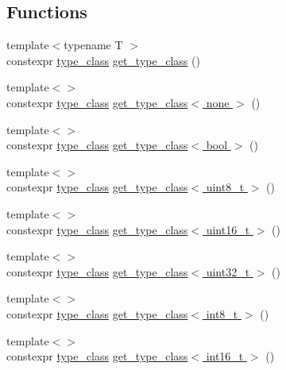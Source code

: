 \subsection*{Functions}
\begin{DoxyCompactItemize}
\item 
{\footnotesize template$<$typename T $>$ }\\constexpr \hyperlink{namespacetelegen_a72d4e69f0be1731e1a851a96dec858d8}{type\+\_\+class} \hyperlink{namespacetelegen_a6ea75c665a463a240f4a40419a810da3}{get\+\_\+type\+\_\+class} ()
\item 
{\footnotesize template$<$$>$ }\\constexpr \hyperlink{namespacetelegen_a72d4e69f0be1731e1a851a96dec858d8}{type\+\_\+class} \hyperlink{namespacetelegen_a19a101eacce3582135d74ce02117b4d6}{get\+\_\+type\+\_\+class$<$ none $>$} ()
\item 
{\footnotesize template$<$$>$ }\\constexpr \hyperlink{namespacetelegen_a72d4e69f0be1731e1a851a96dec858d8}{type\+\_\+class} \hyperlink{namespacetelegen_a63a694a138c7ec92f0d7ee249ba207cd}{get\+\_\+type\+\_\+class$<$ bool $>$} ()
\item 
{\footnotesize template$<$$>$ }\\constexpr \hyperlink{namespacetelegen_a72d4e69f0be1731e1a851a96dec858d8}{type\+\_\+class} \hyperlink{namespacetelegen_a393b0985d3f7fbe2c0d0a2ab5ce8cb4b}{get\+\_\+type\+\_\+class$<$ uint8\+\_\+t $>$} ()
\item 
{\footnotesize template$<$$>$ }\\constexpr \hyperlink{namespacetelegen_a72d4e69f0be1731e1a851a96dec858d8}{type\+\_\+class} \hyperlink{namespacetelegen_a4516777b2981979ee0fa3d6e3f995447}{get\+\_\+type\+\_\+class$<$ uint16\+\_\+t $>$} ()
\item 
{\footnotesize template$<$$>$ }\\constexpr \hyperlink{namespacetelegen_a72d4e69f0be1731e1a851a96dec858d8}{type\+\_\+class} \hyperlink{namespacetelegen_ad713b35737b3879f29061dc6a149558a}{get\+\_\+type\+\_\+class$<$ uint32\+\_\+t $>$} ()
\item 
{\footnotesize template$<$$>$ }\\constexpr \hyperlink{namespacetelegen_a72d4e69f0be1731e1a851a96dec858d8}{type\+\_\+class} \hyperlink{namespacetelegen_a108eb8aee13c82f636d4a2d134851bca}{get\+\_\+type\+\_\+class$<$ int8\+\_\+t $>$} ()
\item 
{\footnotesize template$<$$>$ }\\constexpr \hyperlink{namespacetelegen_a72d4e69f0be1731e1a851a96dec858d8}{type\+\_\+class} \hyperlink{namespacetelegen_a79eff99045f75ea149a890f4938a831f}{get\+\_\+type\+\_\+class$<$ int16\+\_\+t $>$} ()

\end{DoxyCompactItemize}

